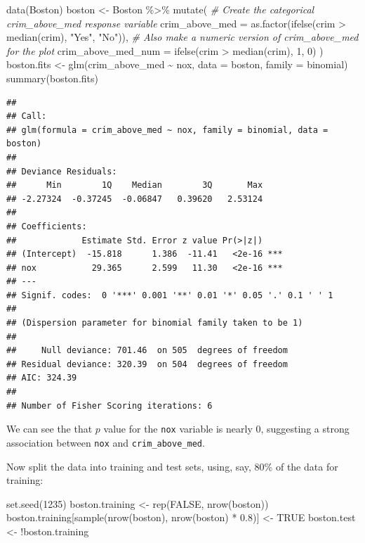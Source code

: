 \documentclass[
]{book}
\newenvironment{Shaded}{\begin{snugshade}}{\end{snugshade}}
\newcommand{\AttributeTok}[1]{\textcolor[rgb]{0.77,0.63,0.00}{#1}}
\newcommand{\CommentTok}[1]{\textcolor[rgb]{0.56,0.35,0.01}{\textit{#1}}}
\newcommand{\ConstantTok}[1]{\textcolor[rgb]{0.00,0.00,0.00}{#1}}
\newcommand{\DecValTok}[1]{\textcolor[rgb]{0.00,0.00,0.81}{#1}}
\newcommand{\FloatTok}[1]{\textcolor[rgb]{0.00,0.00,0.81}{#1}}
\newcommand{\FunctionTok}[1]{\textcolor[rgb]{0.00,0.00,0.00}{#1}}
\newcommand{\NormalTok}[1]{#1}
\newcommand{\OtherTok}[1]{\textcolor[rgb]{0.56,0.35,0.01}{#1}}
\newcommand{\SpecialCharTok}[1]{\textcolor[rgb]{0.00,0.00,0.00}{#1}}
\newcommand{\StringTok}[1]{\textcolor[rgb]{0.31,0.60,0.02}{#1}}
\begin{document}
\begin{Shaded}
\begin{Highlighting}[]
\FunctionTok{data}\NormalTok{(Boston)}
\NormalTok{boston }\OtherTok{\textless{}{-}}\NormalTok{ Boston }\SpecialCharTok{\%\textgreater{}\%}
  \FunctionTok{mutate}\NormalTok{(}
    \CommentTok{\# Create the categorical crim\_above\_med response variable}
    \AttributeTok{crim\_above\_med =} \FunctionTok{as.factor}\NormalTok{(}\FunctionTok{ifelse}\NormalTok{(crim }\SpecialCharTok{\textgreater{}} \FunctionTok{median}\NormalTok{(crim), }\StringTok{"Yes"}\NormalTok{, }\StringTok{"No"}\NormalTok{)),}
    \CommentTok{\# Also make a numeric version of crim\_above\_med for the plot}
    \AttributeTok{crim\_above\_med\_num =} \FunctionTok{ifelse}\NormalTok{(crim }\SpecialCharTok{\textgreater{}} \FunctionTok{median}\NormalTok{(crim), }\DecValTok{1}\NormalTok{, }\DecValTok{0}\NormalTok{)}
\NormalTok{  )}
\NormalTok{boston.fits }\OtherTok{\textless{}{-}} \FunctionTok{glm}\NormalTok{(crim\_above\_med }\SpecialCharTok{\textasciitilde{}}\NormalTok{ nox, }\AttributeTok{data =}\NormalTok{ boston, }\AttributeTok{family =}\NormalTok{ binomial)}
\FunctionTok{summary}\NormalTok{(boston.fits)}
\end{Highlighting}
\end{Shaded}

\begin{verbatim}
## 
## Call:
## glm(formula = crim_above_med ~ nox, family = binomial, data = boston)
## 
## Deviance Residuals: 
##      Min        1Q    Median        3Q       Max  
## -2.27324  -0.37245  -0.06847   0.39620   2.53124  
## 
## Coefficients:
##             Estimate Std. Error z value Pr(>|z|)    
## (Intercept)  -15.818      1.386  -11.41   <2e-16 ***
## nox           29.365      2.599   11.30   <2e-16 ***
## ---
## Signif. codes:  0 '***' 0.001 '**' 0.01 '*' 0.05 '.' 0.1 ' ' 1
## 
## (Dispersion parameter for binomial family taken to be 1)
## 
##     Null deviance: 701.46  on 505  degrees of freedom
## Residual deviance: 320.39  on 504  degrees of freedom
## AIC: 324.39
## 
## Number of Fisher Scoring iterations: 6
\end{verbatim}

We can see the that \(p\) value for the \texttt{nox} variable is nearly 0, suggesting a strong association between \texttt{nox} and \texttt{crim\_above\_med}.

Now split the data into training and test sets, using, say, 80\% of the data for training:

\begin{Shaded}
\begin{Highlighting}[]
\FunctionTok{set.seed}\NormalTok{(}\DecValTok{1235}\NormalTok{)}
\NormalTok{boston.training }\OtherTok{\textless{}{-}} \FunctionTok{rep}\NormalTok{(}\ConstantTok{FALSE}\NormalTok{, }\FunctionTok{nrow}\NormalTok{(boston))}
\NormalTok{boston.training[}\FunctionTok{sample}\NormalTok{(}\FunctionTok{nrow}\NormalTok{(boston), }\FunctionTok{nrow}\NormalTok{(boston) }\SpecialCharTok{*} \FloatTok{0.8}\NormalTok{)] }\OtherTok{\textless{}{-}} \ConstantTok{TRUE}
\NormalTok{boston.test }\OtherTok{\textless{}{-}} \SpecialCharTok{!}\NormalTok{boston.training}
\end{Highlighting}
\end{Shaded}
\end{document}
